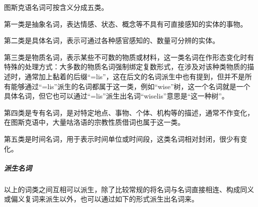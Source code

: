 \documentclass{article}
\begin{document}
图斯克语名词可按含义分成五类。

第一类是抽象名词，表达情感、状态、概念等不具有可直接感知的实体的事物。

第二类是具体名词，表示可通过各种感官感知的、数量可分辨的实体。

第三类是物质名词，表示某些不可数的物质或材料，这一类名词在作形态变化时有特殊的处理方式：大多数的物质名词强制绑定复数形式，在涉及对该种类物质的描述时，通常加上黏着的后缀``=lis''，这在后文的名词派生中也有提到，但并不是所有能够通过``=lis''派生的名词都属于这一类，例如``wise''树，这一个名词就是一个具体名词，但它也可以通过``=lis''派生出名词``wiselis''意思是``这一种树''。

第四类是专有名词，是对特定地点、事物、个体、机构等的描述，通常不作变化，在图斯克语中，大量咕洛语的宗教性质借词也属于这一类。

第五类是时间名词，用于表示时间单位或时间段，这类名词相对封闭，很少有变化。

\subparagraph{派生名词}\label{ux6d3eux751fux540dux8bcd}

以上的词类之间互相可以派生，除了比较常规的将名词与名词直接相连、构成同义或偏义复词来派生以外，也可以通过如下的形式派生出名词来。
\end{document}
